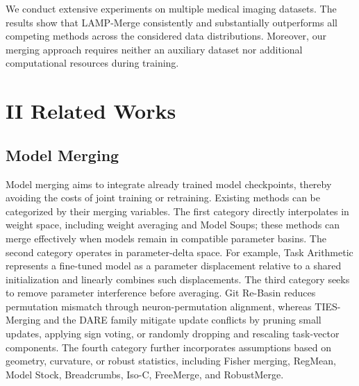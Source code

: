\documentclass[letterpaper]{article} %
\begin{document}
We conduct extensive experiments on multiple medical imaging datasets. The results show that LAMP-Merge consistently and substantially outperforms all competing methods across the considered data distributions. Moreover, our merging approach requires neither an auxiliary dataset nor additional computational resources during training.

\section{II Related Works}

\subsection{Model Merging}

Model merging aims to integrate already trained model checkpoints, thereby avoiding the costs of joint training or retraining. Existing methods can be categorized by their merging variables. The first category directly interpolates in weight space, including weight averaging and Model Soups; these methods can merge effectively when models remain in compatible parameter basins\cite{pmlr-v162-wortsman22a}. The second category operates in parameter-delta space. For example, Task Arithmetic\cite{ilharco2023editingmodelstaskarithmetic} represents a fine-tuned model as a parameter displacement relative to a shared initialization and linearly combines such displacements. The third category seeks to remove parameter interference before averaging. Git Re-Basin\cite{ainsworth2023gitrebasinmergingmodels} reduces permutation mismatch through neuron-permutation alignment, whereas TIES-Merging\cite{yadav2023tiesmergingresolvinginterferencemerging} and the DARE family\cite{yu2024languagemodelssupermario} mitigate update conflicts by pruning small updates, applying sign voting, or randomly dropping and rescaling task-vector components. The fourth category further incorporates assumptions based on geometry, curvature, or robust statistics, including Fisher merging\cite{matena2022mergingmodelsfisherweightedaveraging}, RegMean\cite{jin2025datalessknowledgefusionmerging}, Model Stock\cite{jang2025modelstockneedjust}, Breadcrumbs\cite{davari2024modelbreadcrumbsscalingmultitask}, Iso-C\cite{marczak2025taskleftbehindisotropic}, FreeMerge\cite{zheng2025freemergingfouriertransformefficient}, and RobustMerge\cite{zheng2025freemergingfouriertransformefficient}.
\end{document}

